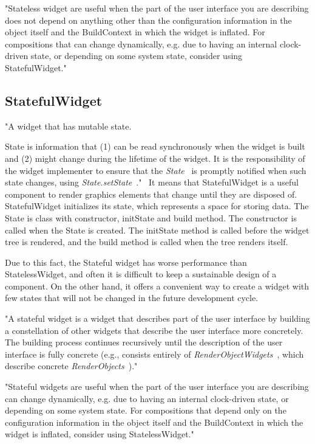 "Stateless widget are useful when the part of the user interface you are describing does not depend on anything other than the configuration information in the object itself and the BuildContext in which the widget is inflated.
For compositions that can change dynamically, e.g. due to having an internal clock-driven state, or depending on some system state, consider using StatefulWidget."~\cite{statelessWidget}


\subsection{StatefulWidget}\label{subsec:statefulwidget}
"A widget that has mutable state.

State is information that (1) can be read synchronously when the widget is built and (2) might change during the lifetime of the widget.
It is the responsibility of the widget implementer to ensure that the \textit{State}~\cite{state} is promptly notified when such state changes, using \textit{State.setState}~\cite{setState}."~\cite{statefulWidget}
It means that StatefulWidget is a useful component to render graphics elements that change until they are disposed of.
StatefulWidget initializes its state, which represents a space for storing data.
The State is class with constructor, initState and build method.
The constructor is called when the State is created.
The initState method is called before the widget tree is rendered, and the build method is called when the tree renders itself.

Due to this fact, the Stateful widget has worse performance than StatelessWidget, and often it is difficult to keep a sustainable design of a component.
On the other hand, it offers a convenient way to create a widget with few states that will not be changed in the future development cycle.

"A stateful widget is a widget that describes part of the user interface by building a constellation of other widgets that describe the user interface more concretely.
The building process continues recursively until the description of the user interface is fully concrete (e.g., consists entirely of
\textit{RenderObjectWidgets}~\cite{renderObjectWidget}, which describe concrete \textit{RenderObjects}~\cite{renderObject})."~\cite{statefulWidget}


"Stateful widgets are useful when the part of the user interface you are describing can change dynamically, e.g. due to having an internal clock-driven state, or depending on some system state.
For compositions that depend only on the configuration information in the object itself and the BuildContext in which the widget is inflated, consider using StatelessWidget."~\cite{statefulWidget}


